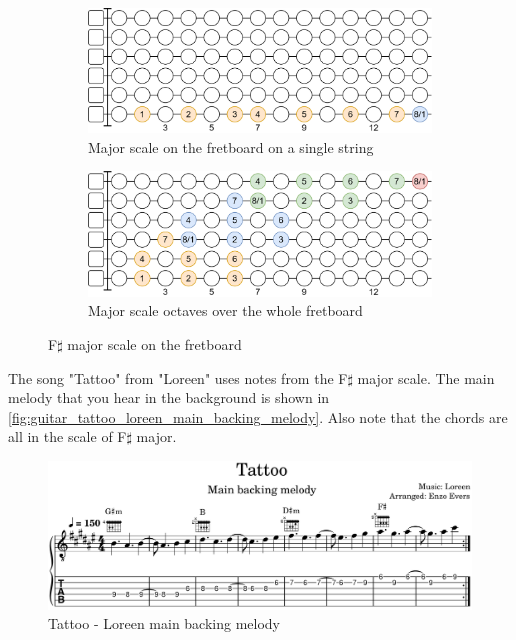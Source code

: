 \begin{figure}[h]
	\vspace{0.5cm}
	
	\begin{subfigure}[b]{\textwidth}
		\centering
		\includegraphics[height=0.18\textheight]{../../Images/guitar_major_scale_single_string.png}
		\caption{Major scale on the fretboard on a single string}
		\label{fig:guitar_major_scale_fretboard_single_string}
	\end{subfigure}
	
	\vspace{0.5cm}
	
	\begin{subfigure}[b]{\textwidth}
		\centering
		\includegraphics[height=0.18\textheight]{../../Images/guitar_major_scale_octaves_over_fretboard.png}
		\caption{Major scale octaves over the whole fretboard}
		\label{fig:guitar_major_scale_octaves_over_fretboard}
	\end{subfigure}
	
	\caption{F$\sharp$ major scale on the fretboard}
	\label{fig:guitar_major_scale_fretboard}
\end{figure}

\clearpage

The song "Tattoo" from "Loreen" uses notes from the F$\sharp$ major scale. The main melody that you hear in the background is shown in \autoref{fig:guitar_tattoo_loreen_main_backing_melody}. Also note that the chords are all in the scale of F$\sharp$ major.

\begin{figure}[h]
	\centering
	\includegraphics[width=\textwidth]{../../MuseScore/Guitar/LoreenTattooSimpleBackingMelody.png}
	\caption{Tattoo - Loreen main backing melody}
	\label{fig:guitar_tattoo_loreen_main_backing_melody}
\end{figure}

